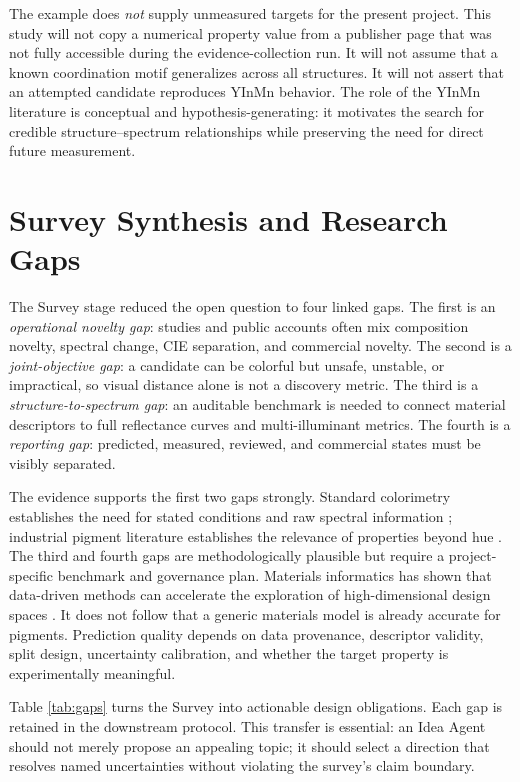 \documentclass[conference]{IEEEtran}
\begin{document}
The example does \emph{not} supply unmeasured targets for the present project. This study will not copy a numerical property value from a publisher page that was not fully accessible during the evidence-collection run. It will not assume that a known coordination motif generalizes across all structures. It will not assert that an attempted candidate reproduces YInMn behavior. The role of the YInMn literature is conceptual and hypothesis-generating: it motivates the search for credible structure--spectrum relationships while preserving the need for direct future measurement.

\section{Survey Synthesis and Research Gaps}

The Survey stage reduced the open question to four linked gaps. The first is an \emph{operational novelty gap}: studies and public accounts often mix composition novelty, spectral change, CIE separation, and commercial novelty. The second is a \emph{joint-objective gap}: a candidate can be colorful but unsafe, unstable, or impractical, so visual distance alone is not a discovery metric. The third is a \emph{structure-to-spectrum gap}: an auditable benchmark is needed to connect material descriptors to full reflectance curves and multi-illuminant metrics. The fourth is a \emph{reporting gap}: predicted, measured, reviewed, and commercial states must be visibly separated.

The evidence supports the first two gaps strongly. Standard colorimetry establishes the need for stated conditions and raw spectral information \cite{cie2018,cie2000}; industrial pigment literature establishes the relevance of properties beyond hue \cite{buxbaum,nassau}. The third and fourth gaps are methodologically plausible but require a project-specific benchmark and governance plan. Materials informatics has shown that data-driven methods can accelerate the exploration of high-dimensional design spaces \cite{butler,curtarolo,materialsproject}. It does not follow that a generic materials model is already accurate for pigments. Prediction quality depends on data provenance, descriptor validity, split design, uncertainty calibration, and whether the target property is experimentally meaningful.

Table \ref{tab:gaps} turns the Survey into actionable design obligations. Each gap is retained in the downstream protocol. This transfer is essential: an Idea Agent should not merely propose an appealing topic; it should select a direction that resolves named uncertainties without violating the survey's claim boundary.
\end{document}
